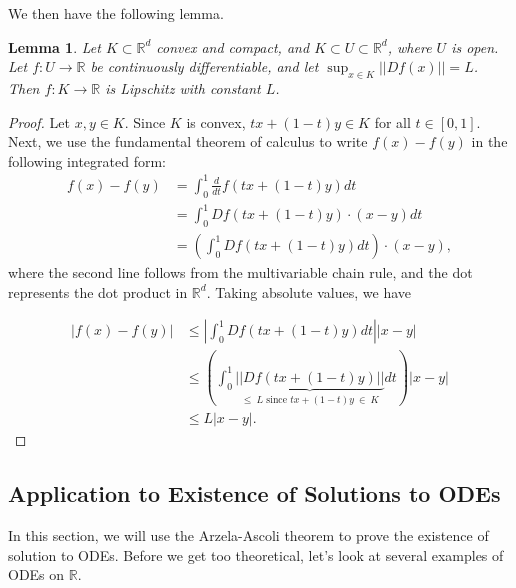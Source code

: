 \documentclass[12pt]{amsart}         %
\newtheorem{lemma}{Lemma}[section]
\theoremstyle{remark}
\newcommand{\R}{\mathbb{R}}
\begin{document}
We then have the following lemma.

\begin{lemma}
Let $K \subset \R^d$ convex and compact, and $K \subset U \subset \R^d$, where $U$ is open. Let $f: U \rightarrow \R$ be continuously differentiable, and let $\sup_{x \in K} ||Df(x)|| = L$. Then $f: K \rightarrow \R$ is Lipschitz with constant $L$.
\end{lemma}

\begin{proof}
Let $x,y \in K$. Since $K$ is convex, $tx + (1 - t)y \in K$ for all 
$t \in [0,1]$. Next, we use the fundamental theorem of calculus to write $f(x)- f(y)$ in the following integrated form:
\begin{align*}
f(x)- f(y) &= \int_0^1 \frac{d}{dt} f\left(tx + (1-t)y\right) dt \\
&= \int_0^1 Df(tx + (1-t)y) \cdot (x-y) dt \\
&= \left( \int_0^1 Df(tx + (1-t)y) dt \right) \cdot (x-y),
\end{align*}
where the second line follows from the multivariable chain rule, and the dot represents the dot product in $\R^d$. Taking absolute values, we have

\begin{align*}        
|f(x)- f(y)| &\leq \left| \int_0^1 Df(tx + (1-t)y) dt \right| |x-y| \\
&\leq \left( \int_0^1 \underbrace{ || Df(tx + (1-t)y) || }_{\leq\:L \text{ since } tx + (1 - t)y\:\in\:K } dt \right) |x-y| \\
&\leq L |x-y|.
\end{align*}
    
\end{proof}

\subsection{Application to Existence of Solutions to ODEs}

In this section, we will use the Arzela-Ascoli theorem to prove the existence of solution to ODEs. Before we get too theoretical, let's look at several examples of ODEs on $\R$.
\end{document}
